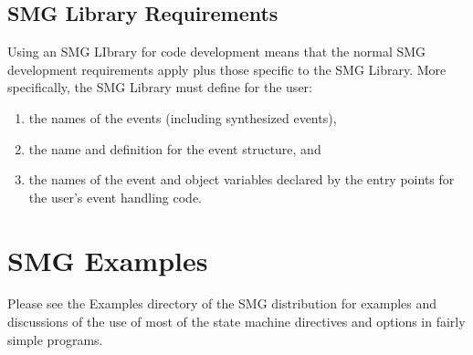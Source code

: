 \subsection{SMG Library Requirements}

Using an SMG LIbrary for code development means that the normal SMG development requirements apply plus those specific to the SMG Library.  More specifically, the SMG Library must define for the user:

\begin{enumerate}
\item the names of the events (including synthesized events), 
\item the name and definition for the event structure, and 
\item the names of the event and object variables declared by the entry points for the user's event handling code.
\end{enumerate}


\section{SMG Examples}

Please see the Examples directory of the SMG distribution for examples
and discussions of the use of most of the state machine directives and
options in fairly simple programs.

